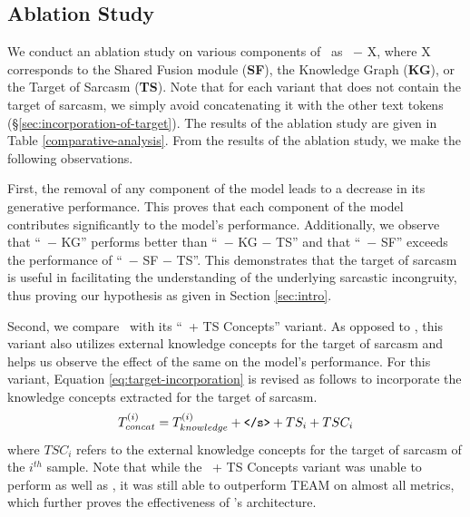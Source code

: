 
\subsection{Ablation Study}
\label{sec:ablation}
% 

We conduct an ablation study on various components of \model\ as \model\ $-$ X, where X corresponds to the Shared Fusion module (\textbf{SF}), the Knowledge Graph (\textbf{KG}), or the Target of Sarcasm (\textbf{TS}). Note that for each variant that does not contain the target of sarcasm, we simply avoid concatenating it with the other text tokens (\S \ref{sec:incorporation-of-target}). The results of the ablation study are given in Table \ref{comparative-analysis}. From the results of the ablation study, we make the following observations.

First, the removal of any component of the model leads to a decrease in its generative performance. This proves that each component of the model contributes significantly to the model's performance. Additionally, we observe that ``\model\ $-$ KG'' performs better than ``\model\ $-$ KG $-$ TS'' and that ``\model\ $-$ SF'' exceeds the performance of ``\model\ $-$ SF $-$ TS''. This demonstrates that the target of sarcasm is useful in facilitating the understanding of the underlying sarcastic incongruity, thus proving our hypothesis as given in Section \ref{sec:intro}.

Second, we compare \model\ with its ``\model\ + TS Concepts'' variant. As opposed to \model, this variant also utilizes external knowledge concepts for the target of sarcasm and helps us observe the effect of the same on the model's performance. For this variant, Equation \ref{eq:target-incorporation} is revised as follows to incorporate the knowledge concepts extracted for the target of sarcasm.
\begin{equation}
\label{eq:TS-concepts-incorporation}
T_{concat}^{(i)} = T_{knowledge}^{(i)} + \verb|</s>| + TS_i + TSC_i
\end{equation}
where $TSC_i$ refers to the external knowledge concepts for the target of sarcasm of the $i^{th}$ sample. Note that while the \model\ + TS Concepts variant was unable to perform as well as \model, it was still able to outperform TEAM on almost all metrics, which further proves the effectiveness of \model's architecture.
